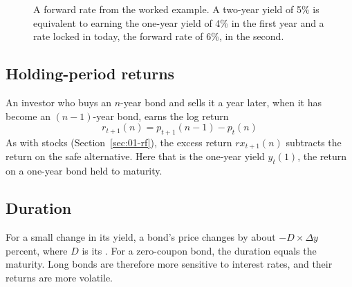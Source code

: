 \begin{figure}[htbp]
\centering
{}
\caption{A forward rate from the worked example. A two-year yield of 5\% is equivalent to earning the one-year yield of 4\% in the first year and a rate locked in today, the forward rate of 6\%, in the second.}
\label{fig:07-forward-diagram}
\end{figure}


\subsection{Holding-period returns}

An investor who buys an $n$-year bond and sells it a year later, when it has become an $(n-1)$-year bond, earns the log return
\begin{equation}
  r_{t+1}(n) = p_{t+1}(n-1) - p_t(n)
  \label{eq:07-hpr}
\end{equation}
As with stocks (Section~\ref{sec:01-rf}), the excess return $rx_{t+1}(n)$ subtracts the return on the safe alternative. Here that is the one-year yield $y_t(1)$, the return on a one-year bond held to maturity.

\subsection{Duration}

For a small change in its yield, a bond's price changes by about $-D \times \Delta y$ percent, where $D$ is its . For a zero-coupon bond, the duration equals the maturity. Long bonds are therefore more sensitive to interest rates, and their returns are more volatile.

